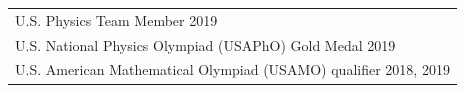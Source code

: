 \begin{longtable}{p{}}
U.S. Physics Team Member \hfill 2019 \\
U.S. National Physics Olympiad (USAPhO) Gold Medal \hfill 2019 \\
U.S. American Mathematical Olympiad (USAMO) qualifier \hfill 2018, 2019
\end{longtable}